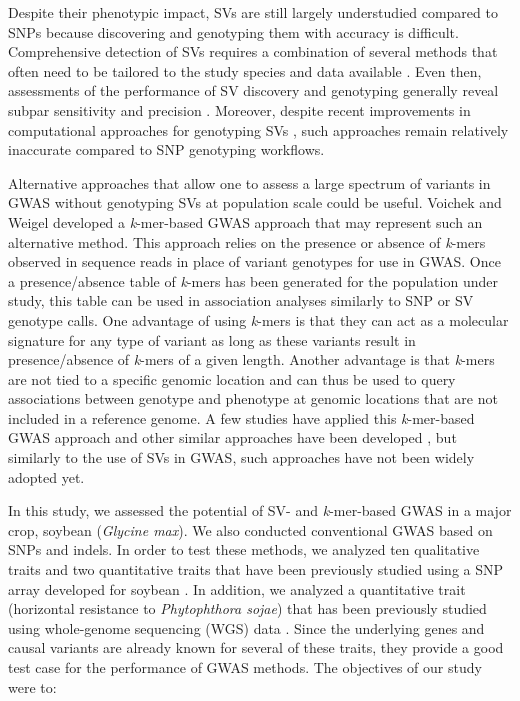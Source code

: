 \documentclass{article}
\begin{document}
Despite their phenotypic impact, SVs are still largely understudied compared to
SNPs because discovering and genotyping them with accuracy is difficult.
Comprehensive detection of SVs requires a combination of several methods that
often need to be tailored to the study species and data available
\cite{alkan2011, ho2020}. Even then, assessments of the performance of SV
discovery and genotyping generally reveal subpar sensitivity and precision
\cite[e.g.][]{cameron2019, chaisson2019, kosugi2019}. Moreover, despite recent
improvements in computational approaches for genotyping SVs
\cite[e.g.][]{siren2021, ebler2022}, such approaches remain relatively
inaccurate compared to SNP genotyping workflows.

Alternative approaches that allow one to assess a large spectrum
of variants in GWAS without genotyping SVs at population scale could be useful.
Voichek and Weigel \cite{voichek2020} developed a \emph{k}-mer-based GWAS approach that may
represent such an alternative method. This approach relies on the presence or
absence of \emph{k}-mers observed in sequence reads in place of variant genotypes for use in
GWAS. Once a presence/absence table of \emph{k}-mers has been generated for the
population under study, this table can be used in association analyses
similarly to SNP or SV genotype calls. One advantage of using \emph{k}-mers is
that they can act as a molecular signature for any type of variant as long as
these variants result in presence/absence of \emph{k}-mers of a given length.
Another advantage is that \emph{k}-mers are not tied to a specific genomic
location and can thus be used to query associations between genotype and
phenotype at genomic locations that are not included in a reference genome.  A
few studies have applied this \emph{k}-mer-based GWAS approach
\cite[e.g.][]{tripodi2021, colque2021} and other similar approaches have been
developed \cite{rahman2018, he2021}, but similarly to the use of SVs in GWAS,
such approaches have not been widely adopted yet.

In this study, we assessed the potential of SV- and \emph{k}-mer-based GWAS in
a major crop, soybean (\emph{Glycine max}). We also conducted conventional GWAS
based on SNPs and indels. In order to test these methods, we analyzed ten
qualitative traits \cite{bandillo2017} and two quantitative traits
\cite{bandillo2015} that have been previously studied using a SNP array
developed for soybean \cite{song2013}. In addition, we analyzed a quantitative
trait (horizontal resistance to \emph{Phytophthora sojae}) that has been
previously studied using whole-genome sequencing (WGS) data
\cite{deronne2022}.  Since the underlying genes and causal variants are
already known for several of these traits, they provide a good test case for
the performance of GWAS methods.  The objectives of our study were to:
\end{document}
